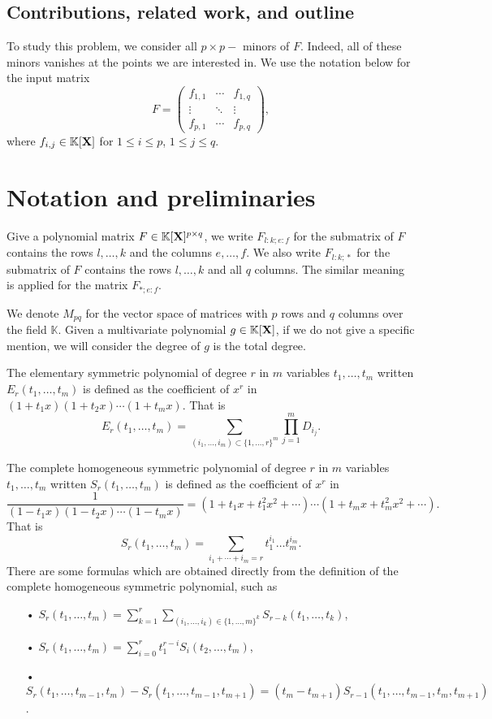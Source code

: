 \documentclass[11pt]{article}
\numberwithin{Property}{section}
\numberwithin{Theorem}{section}
\numberwithin{Proposition}{section}
\numberwithin{Lemma}{section}
\numberwithin{Corollary}{section}
\numberwithin{Definition}{section}
\numberwithin{Remark}{section}
\numberwithin{Conjecture}{section}
\numberwithin{Problem}{section}
\numberwithin{Example}{section}
\numberwithin{Claim}{section}
\renewcommand{\leq}{\leqslant}
\newcommand{\field}{\mathbb{K}} %
\newcommand{\mat}[1]{\mathbf{\MakeUppercase{#1}}} %
\begin{document}
\subsection{Contributions, related work, and outline}
To study this problem, we consider all $p \times p-$ minors of $F$. Indeed, all of these minors vanishes at the points we are interested in. We use the notation below for the input matrix
\[ F = 
\left( \begin{matrix}
f_{1,1} & \cdots & f_{1,q}\\
\vdots & \ddots & \vdots \\
f_{p,1} & \cdots & f_{p,q}
\end{matrix} \right),
\]
where $f_{i,j} \in \field[\mat{X}]$ for $1 \leq i \leq p$, $1 \leq j \leq q$.
\section{Notation and preliminaries}
\label{sec:not}
Give a polynomial matrix $F \in \field[\mat{X}]^{p \times q}$, we write $F_{l:k \mathbf{;} e:f}$ for the submatrix of $F$ contains the rows $l, \ldots, k$ and the columns $e, \ldots, f$. We also write $F_{l:k \mathbf{;} *}$ for the submatrix of $F$ contains the rows $l, \ldots, k$ and all $q$ columns. The similar meaning is applied for the matrix $F_{* \mathbf{;} e:f}$. 

We denote $M_{pq}$ for the vector space of matrices with $p$ rows and $q$ columns over the field $\field$. Given a multivariate polynomial $g \in \field[\mat{X}]$, if we do not give a specific mention, we will consider the degree of $g$ is the total degree.  %

The elementary symmetric polynomial of degree $r$ in $m$ variables $t_1, \ldots, t_m$ written $E_{r}(t_1, \ldots, t_m)$ is defined as the coefficient of $x^r$ in $(1+t_1x)(1+t_2x)\cdots(1+t_mx)$. That is
\[E_{r}(t_1, \ldots, t_m) = \sum_{(i_1,\ldots,i_{m}) \subset \{1, \ldots, r\}^{m}}\prod_{j =1}^{m}D_{i_j}.\]

The complete homogeneous symmetric polynomial of degree $r$ in $m$ variables $t_1, \ldots, t_m$ written $S_{r}(t_1, \ldots, t_m)$ is defined as the coefficient of $x^{r}$ in $$\frac{1}{(1-t_1x)(1-t_2x)\cdots(1-t_mx)} = (1+t_1x + t_1^2x^2 + \cdots)\cdots(1+t_mx + t_m^2x^2 + \cdots).$$
That is 
\[
S_r(t_1, \ldots, t_m) = \sum_{i_1 + \cdots + i_m = r} t_1^{i_1}\ldots t_m^{i_m}. 
\]
There are some formulas which are obtained directly from the definition of the complete homogeneous symmetric polynomial, such as 
\begin{itemize}
\item[•] $S_{r}(t_1, \ldots, t_m) =  \sum\limits_{k=1}^r\sum\limits_{(i_1, \ldots, i_k) \in \{1, \ldots, m\}^k}S_{r-k}(t_1, \ldots, t_k)$,
\item[•] $S_{r}(t_1, \ldots, t_{m}) = \sum\limits_{i=0}^{r}t_1^{r-i}S_i(t_2, \ldots, t_m)$,
\item[•] $S_r(t_1, \ldots, t_{m-1}, t_m) - S_r(t_1, \ldots, t_{m-1}, t_{m+1}) = (t_m - t_{m+1})S_{r-1}(t_1, \ldots, t_{m-1}, t_m, t_{m+1})$. 
\end{itemize}
\end{document}
